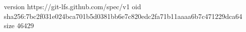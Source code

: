 version https://git-lfs.github.com/spec/v1
oid sha256:7bc2f031e024bca701b5d0381bb6e7c820edc2fa71b11aaaa6b7c471229dca64
size 46429
